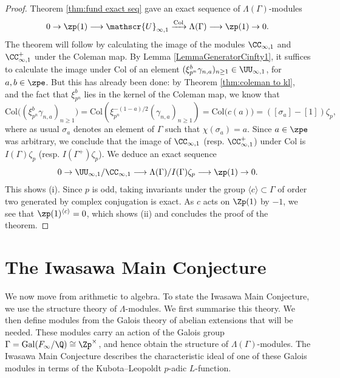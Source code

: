 \documentclass[a4paper,10pt, english, reqno]{smfart}
\newcommand{\GG}{\Gamma}
\numberwithin{equation}{section}
\begin{document}
\begin{proof}
	Theorem \ref{thm:fund exact seq} gave an exact sequence of $\Lambda(\GG)$-modules 
	\[ 
	0 \to \zp(1) \longrightarrow \mathscr{U}_{\infty, 1} \xrightarrow{\mathrm{Col}} \Lambda(\GG) \longrightarrow \zp(1) \to 0. 
	\]
	The theorem will follow by calculating the image of the modules $\CC_{\infty, 1}$ and $\CC^+_{\infty, 1}$ under the Coleman map. By Lemma \ref{LemmaGeneratorCinfty1}, it suffices to calculate the image under $\mathrm{Col}$ of an element $(\xi_{p^n}^b \gamma_{n,a})_{n \geq 1} \in \UU_{\infty, 1}$, for $a, b \in \zpe$. But this has already been done:  by Theorem \ref{thm:coleman to kl}, and the fact that $\xi_{p^n}^b$ lies in the kernel of the Coleman map, we know that 
	\[ 
	\mathrm{Col} \big( (\xi_{p^n}^b \gamma_{n,a})_{n \geq 1} \big) = \mathrm{Col} \left( \xi_{p^n}^{-(1-a)/2}(\gamma_{n,a})_{n \geq 1} \right) = \mathrm{Col}\big( c(a) \big) = ([\sigma_a] - [1]) \zeta_p, 
	\]
	where as usual $\sigma_a$ denotes an element of $\GG$ such that $\chi(\sigma_a) = a.$ Since $a \in \zpe$ was arbitrary, we conclude that the image of $\CC_{\infty, 1}$ (resp. $\CC^+_{\infty, 1}$) under $\mathrm{Col}$ is $I(\GG) \zeta_p$ (resp. $I(\GG^+) \zeta_p$). We deduce an exact sequence
	\[ 0 \to \UU_{\infty, 1} / \CC_{\infty, 1} \longrightarrow \Lambda(\GG) / I(\GG) \zeta_p \longrightarrow \zp(1) \to 0. \] 
	This shows (i). Since $p$ is odd, taking invariants under the group $\langle c \rangle \subset \GG$ of order two generated by complex conjugation is exact. As $c$ acts on $\Zp(1)$ by $-1$, we see that $\zp(1)^{\langle c \rangle} = 0$, which shows (ii) and concludes the proof of the theorem.
\end{proof}





\section{The Iwasawa Main Conjecture}\label{sec:IMC}
 
 
 We now move from arithmetic to algebra. To state the Iwasawa Main Conjecture, we use the structure theory of $\Lambda$-modules. We first summarise this theory. We then define modules from the Galois theory of abelian extensions that will be needed. These modules carry an action of the Galois group $\GG = \mathrm{Gal}(F_\infty/\Q) \cong \Zp^\times$, and hence obtain the structure of $\Lambda(\GG)$-modules. The Iwasawa Main Conjecture describes the characteristic ideal of one of these Galois modules in terms of the Kubota--Leopoldt $p$-adic $L$-function.
 
\end{document}
